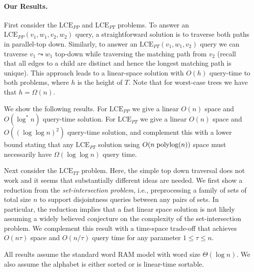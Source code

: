 \documentclass [10pt]{article}
\newcommand{\LCEPP}{\ensuremath{\mathrm{LCE}_{\mathit{PP}}}}
\newcommand{\LCEPT}{\ensuremath{\mathrm{LCE}_{\mathit{PT}}}}
\newcommand{\LCETT}{\ensuremath{\mathrm{LCE}_{\mathit{TT}}}}
\newcommand{\polylog}{\text{\hspace{1mm}polylog}}
\begin{document}
\paragraph{\bf Our Results.}
First consider the $\LCEPP$ and $\LCEPT$ problems. To answer an $\LCEPP(v_1, w_1, v_2, w_2)$ query, a straightforward solution is to traverse both paths in parallel-top down. Similarly, to answer an $\LCEPT(v_1, w_1, v_2)$ query we can traverse $v_1 \leadsto w_1$  top-down while traversing the matching path from $v_2$ (recall that all edges to a child are distinct and hence the longest matching path is unique). This approach leads to a linear-space  solution with $O(h)$ query-time  to both problems, where $h$ is the height of $T$. Note that for worst-case trees we have that $h = \Omega(n)$. 

We show the following results. For $\LCEPP$ we give a linear $O(n)$ space and $O(\log^{*} n)$ query-time solution. For  $\LCEPT$  we give a linear  $O(n)$ space and $O((\log\log n)^{2})$ query-time solution, and complement this with a lower bound stating that any  $\LCEPT$ solution using $O(n \polylog(n))$ space must necessarily
have $\Omega(\log\log n)$ query time.
 


Next consider the $\LCETT$ problem. Here, the simple top down traversal does not  work and it seems that substantially different ideas are needed. We first show a reduction from the \emph{set-intersection problem}, i.e., preprocessing a family of sets of total size $n$ to support disjointness queries between any pairs of sets. In particular, the reduction implies that a fast linear space solution is not likely assuming a widely believed conjecture on the complexity of the set-intersection problem. We complement this result with a time-space trade-off that achieves $O(n\tau)$ space and $O(n/\tau)$ query time for any parameter $1 \leq \tau \leq n$.


All results assume the standard word RAM model with word size $\Theta(\log n)$. We also assume the alphabet is either sorted or is linear-time sortable.
\end{document}
